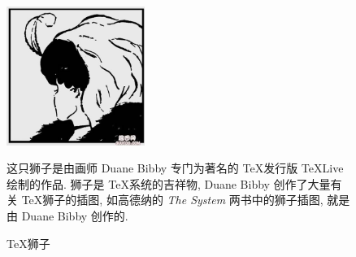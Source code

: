 \documentclass[nofonts]{ctexart}
\begin{document}
\begin{figure}
	\centering
	\includegraphics[width=0.4\textwidth]{lady.jpg}
	\qquad
	\parbox[b]{0.4\textwidth}{这只狮子是由画师 Duane Bibby 专门为著名的
		\TeX 发行版 TeXLive 绘制的作品. 狮子是 \TeX 系统的吉祥物, Duane
		Bibby 创作了大量有关 \TeX 狮子的插图, 如高德纳的
		\textit{The System} 两书中的狮子插图, 就是由 Duane Bibby 创作的.
	}
	\caption{\TeX 狮子}\label{fig:textlivelion}
\end{figure}
\end{document}
